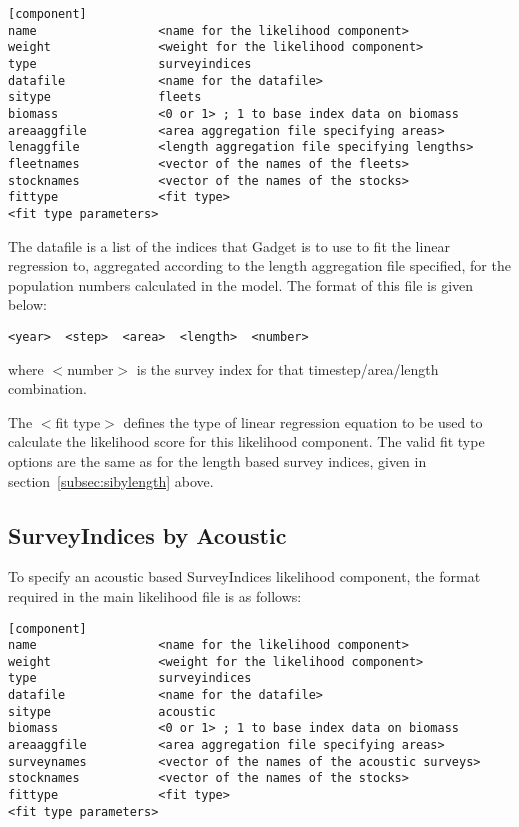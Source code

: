 \documentclass[10pt,twoside]{book}
\begin{document}
{\small\begin{verbatim}
[component]
name                 <name for the likelihood component>
weight               <weight for the likelihood component>
type                 surveyindices
datafile             <name for the datafile>
sitype               fleets
biomass              <0 or 1> ; 1 to base index data on biomass
areaaggfile          <area aggregation file specifying areas>
lenaggfile           <length aggregation file specifying lengths>
fleetnames           <vector of the names of the fleets>
stocknames           <vector of the names of the stocks>
fittype              <fit type>
<fit type parameters>
\end{verbatim}}

The datafile is a list of the indices that Gadget is to use to fit the linear regression to, aggregated according to the length aggregation file specified, for the population numbers calculated in the model.  The format of this file is given below:

{\small\begin{verbatim}
<year>  <step>  <area>  <length>  <number>
\end{verbatim}}

where $<$number$>$ is the survey index for that timestep/area/length combination.

\bigskip
The $<$fit type$>$ defines the type of linear regression equation to be used to calculate the likelihood score for this likelihood component.  The valid fit type options are the same as for the length based survey indices, given in section~\ref{subsec:sibylength} above.

\subsection{SurveyIndices by Acoustic}\label{subsec:sibyacoustic}
To specify an acoustic based SurveyIndices likelihood component, the format required in the main likelihood file is as follows:

{\small\begin{verbatim}
[component]
name                 <name for the likelihood component>
weight               <weight for the likelihood component>
type                 surveyindices
datafile             <name for the datafile>
sitype               acoustic
biomass              <0 or 1> ; 1 to base index data on biomass
areaaggfile          <area aggregation file specifying areas>
surveynames          <vector of the names of the acoustic surveys>
stocknames           <vector of the names of the stocks>
fittype              <fit type>
<fit type parameters>
\end{verbatim}}
\end{document}
